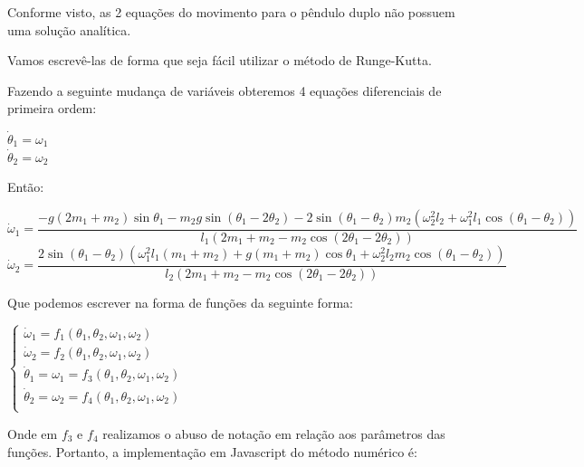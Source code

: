 \documentclass[13pt,a4paper]{report}
\begin{document}
Conforme visto, as 2 equações do movimento para o pêndulo duplo não possuem uma solução analítica.

Vamos escrevê-las de forma que seja fácil utilizar o método de Runge-Kutta.

Fazendo a seguinte mudança de variáveis obteremos 4 equações diferenciais de primeira ordem:
\begin{center}
$
\dot{\theta}_{1} = \omega_{1}
$
\\[2mm]
$
\dot{\theta}_{2} = \omega_{2}
$
\end{center}
Então:
\begin{center}
$
{
\dot{\omega}_{1} = 
\dfrac{-g\left(2m_{1} + m_{2}\right)\sin\theta_{1}
-m_{2}g\sin\left(\theta_{1}	-2\theta_{2}\right)
-2\sin\left(\theta_{1} -\theta_{2}\right)
m_{2}\left(\omega_{2}^{2}l_{2} + \omega_{1}^{2}l_{1}\cos\left(\theta_{1} -\theta_{2}\right)\right)}{l_{1}\left(2m_{1} + m_{2} -m_{2}\cos\left(2\theta_{1}- 2\theta_{2}\right)\right)}}
$
\\[2mm]
$
{
\dot{\omega}_{2}  =
\dfrac{2\sin\left(\theta_{1} - \theta_{2}\right)\left(
\omega_{1}^{2}l_{1}\left(m_{1} + m_{2}\right) +
g\left(m_{1} + m_{2}\right)\cos\theta_{1} + \omega_{2}^{2}l_{2}m_{2}\cos\left(
\theta_{1} - \theta_{2}\right)\right)}{l_{2}\left(2m_{1} + m_{2} -m_{2}\cos\left(2\theta_{1}- 2\theta_{2}\right)\right)}}
$
\end{center}
Que podemos escrever na forma de funções da seguinte forma:
\begin{center}
$
\left \{
\begin{array}{l}
\dot{\omega}_{1} = f_{1}\left(\theta_{1},\theta_{2},\omega_{1},\omega_{2}\right) \\
\dot{\omega}_{2} = f_{2}\left(\theta_{1},\theta_{2},\omega_{1},\omega_{2}\right) \\
\dot{\theta}_{1} = \omega_{1} = f_{3}\left(\theta_{1},\theta_{2},\omega_{1},\omega_{2}\right) \\
\dot{\theta}_{2} = \omega_{2} = f_{4}\left(\theta_{1},\theta_{2},\omega_{1},\omega_{2}\right) \\
\end{array}
\right.
$
\end{center}
Onde em $f_{3}$ e $f_{4}$ realizamos o abuso de notação em relação aos
parâmetros das funções.
\clearpage
Portanto, a implementação em Javascript do método numérico é:
\end{document}

